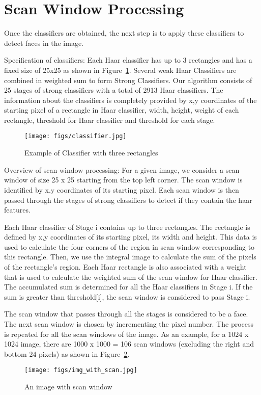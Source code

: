 \section{Scan Window Processing}\label{sec:haar}



Once the classifiers are obtained, the next step is to apply these classifiers to detect faces in the image. 

Specification of classifiers:
Each Haar classifier has up to 3 rectangles and has a fixed size of 25x25 as shown in Figure~\ref{fig:classifier}. 
Several weak Haar Classifiers are combined in weighted sum to form Strong Classifiers. 
Our algorithm consists of 25 stages of strong classifiers with a total of 2913 Haar classifiers. 
The information about the classifiers is completely provided by x,y coordinates of the starting 
pixel of a rectangle in Haar classifier, width, height, weight of each rectangle, threshold for 
Haar classifier and threshold for each stage. 
\begin{figure}[h]
  \centering 
  \texttt{[image: figs/classifier.jpg]}
  \caption{Example of Classifier with three rectangles \textnormal{\small }  }
  \label{fig:classifier}
\end{figure}


Overview of scan window processing:
For a given image, we consider a scan window of size 25 x 25 starting from the top left corner. 
The scan window is identified by x,y coordinates of its starting pixel. Each scan window is 
then passed through the stages of strong classifiers to detect if they contain the haar features. 

Each Haar classifier of Stage i contains up to three rectangles. The rectangle is defined by 
x,y coordinates of its starting pixel, its width and height. This data is used to calculate the 
four corners of the region in scan window corresponding to this rectangle. Then, we use the 
integral image to calculate the sum of the pixels of the rectangle’s region. Each Haar rectangle
is also associated with a weight that is used to calculate the weighted sum of the scan window for Haar
classifier. The accumulated sum is determined for all the Haar classifiers in Stage i. If the sum 
is greater than threshold[i], the scan window is considered to pass Stage i.

The scan window that passes through all the stages is considered to be a face. 
The next scan window is chosen by incrementing the pixel number. The process is repeated for all 
the scan windows of the image. As an example, for a 1024 x 1024 image, there are 1000 x 1000 = 106 
scan windows (excluding the right and bottom 24 pixels) as shown in Figure~\ref{fig:img_scan}. 
\begin{figure}[h]
  \centering 
  \texttt{[image: figs/img\_with\_scan.jpg]}
  \caption{An image with scan window \textnormal{\small }  }
  \label{fig:img_scan}
\end{figure}


